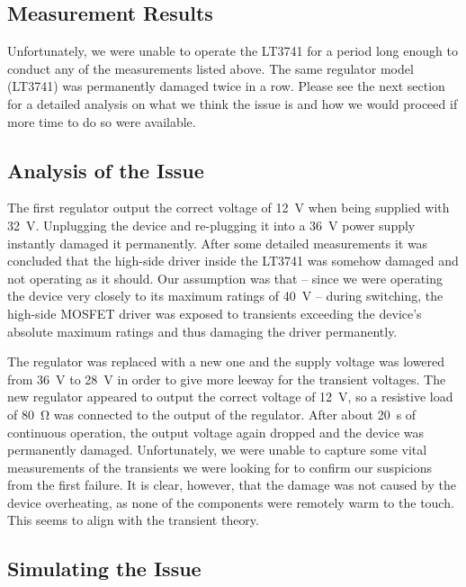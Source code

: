\subsection{Measurement Results}

Unfortunately, we were unable to  operate the LT3741 for a period long enough to
conduct any of the measurements listed above.  The same regulator model (LT3741)
was  permanently  damaged  twice  in  a row. Please see the next section  for  a
detailed analysis on what we think the issue is and how we would proceed if more
time to do so were available.


\subsection{Analysis of the Issue}
\label{subsec:analysis_issue}

The  first regulator output the correct voltage  of  \SI{12}{\volt}  when  being
supplied  with  \SI{32}{\volt}.  Unplugging the device and re-plugging it into a
\SI{36}{\volt}  power  supply  instantly  damaged  it  permanently.  After  some
detailed measurements it  was  concluded  that  the  high-side driver inside the
LT3741  was somehow damaged and not operating as it should. Our  assumption  was
that -- since we were  operating  the device very closely to its maximum ratings
of  \SI{40}{\volt} -- during switching, the high-side MOSFET driver was  exposed
to transients exceeding the device's absolute maximum ratings  and thus damaging
the driver permanently.

The regulator was replaced  with a new one and the  supply voltage was lowered
from \SI{36}{\volt}  to \SI{28}{\volt} in  order to  give more leeway  for the
transient voltages. The new  regulator appeared to output  the correct voltage
of  \SI{12}{\volt}, so  a resistive  load  of \SI{80}{\ohm}  was connected  to
the  output of  the  regulator.  After  about  \SI{20}{\second} of  continuous
operation, the  output voltage  again dropped and  the device  was permanently
damaged. Unfortunately, we were  unable to capture some  vital measurements of
the transients  we were looking for  to confirm our suspicions  from the first
failure.  It is clear,  however, that the damage was not  caused by the device
overheating, as none  of the components were remotely warm  to the touch. This
seems to align with the transient theory.


\subsection{Simulating the Issue}

